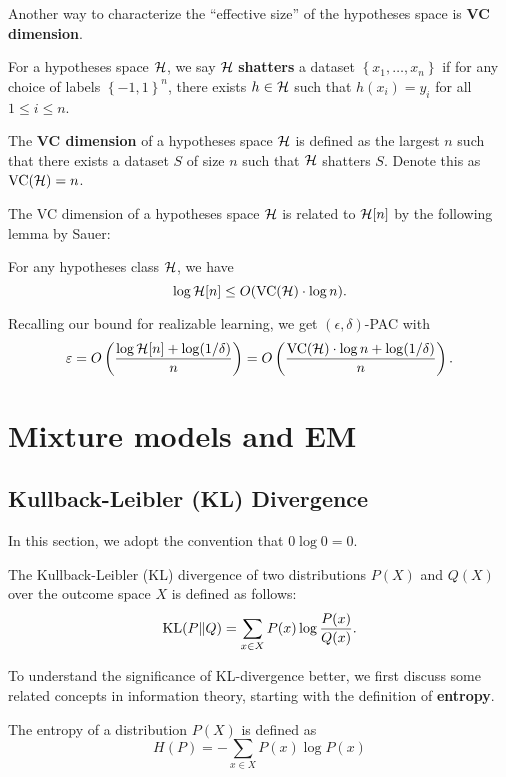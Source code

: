 \documentclass[a4paper]{article}
\begin{document}
Another way to characterize the ``effective size'' of the 
hypotheses space is \textbf{VC dimension}.

\begin{defi}[VC dimension]
  For a hypotheses space $\mathcal{H}$, we say 
  $\mathcal{H}$ \textbf{shatters} a dataset 
  $\left\{ x_1, \dots, x_n \right\}$ if 
  for any choice of labels 
  $\left\{ -1, 1 \right\}^n$, there exists 
  $h \in \mathcal{H}$ such that $h(x_i) = y_i$ 
  for all $1 \leq i \leq n$.
  
  The \textbf{VC dimension} of a hypotheses 
  space $\mathcal{H}$ is defined 
  as the largest $n$ such that there exists a dataset $S$  
  of size $n$ such that $\mathcal{H}$ shatters $S$.
  Denote this as $\operatorname{VC}(\mathcal{H}) = n$.
\end{defi}

The VC dimension of a hypotheses space $\mathcal{H}$ is 
related to $\mathcal{H}[n]$ by the following lemma by 
Sauer: 

\begin{thm}
  For any hypotheses class $\mathcal{H}$, we have 
  \[
  \log \mathcal{H}[n] \leq O(\operatorname{VC}(\mathcal{H}) \cdot \log n).
  \]
\end{thm}

Recalling our bound for realizable learning, we get
$(\epsilon, \delta)$-PAC with  
\[
\varepsilon = O \left( \frac{\log \mathcal{H}[n] + \log (1 / \delta)}{n} \right) 
= O \left( \frac{\operatorname{VC}(\mathcal{H}) \cdot \log n + \log (1 / \delta)}{n} \right).
\]




\section{Mixture models and EM}

\subsection{Kullback-Leibler (KL) Divergence}
In this section, we adopt the convention that $0 \log 0 = 0$.

\begin{defi}[KL divergence]
  The Kullback-Leibler (KL) divergence of two  
  distributions $P(X)$ and $Q(X)$ 
  over the outcome space $X$ is defined as follows: 
  \[
  \operatorname{KL} (P \Vert Q) = \sum_{x \in X} P(x) \log \frac{P(x)}{Q(x)}.
  \]
\end{defi}

To understand the significance of KL-divergence better, 
we first discuss some related concepts in information theory,
starting with the definition of \textbf{entropy}.
\begin{defi}
  The entropy of a distribution $P(X)$ 
  is defined as 
  \[
  H(P) = - \sum_{x \in X} P(x) \log P(x)
  \]
\end{defi}
\end{document}
